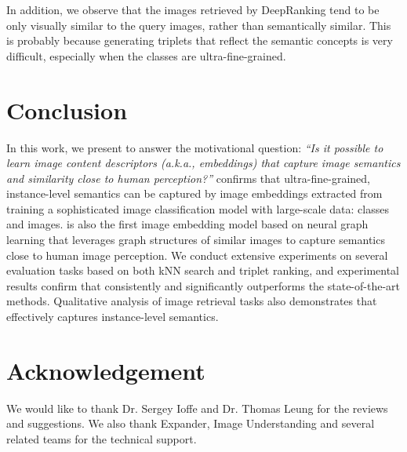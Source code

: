 \documentclass[sigconf]{acmart}
\begin{document}
In addition, we observe that the images retrieved by DeepRanking tend to be only visually similar to the query images, rather than semantically similar. This is probably because generating triplets that reflect the semantic concepts is very difficult, especially when the classes are ultra-fine-grained. 
 
\section{Conclusion}
\label{sec:conclusion}


In this work, we present {\ourmodel} to answer the motivational question: \textit{``Is it possible to learn image content descriptors (a.k.a., embeddings) that capture image semantics and similarity close to human perception?''} {\ourmodel} confirms that ultra-fine-grained, instance-level semantics can be captured by image embeddings extracted from training a sophisticated image classification model with large-scale data:  classes and  images. {\ourmodel} is also the first image embedding model based on neural graph learning that leverages graph structures of similar images to capture semantics close to human image perception. We conduct extensive experiments on several evaluation tasks based on both kNN search and triplet ranking, and experimental results confirm that {\ourmodel} consistently and significantly outperforms the state-of-the-art methods. Qualitative analysis of image retrieval tasks also demonstrates that {\ourmodel} effectively captures instance-level semantics.
 
\section*{Acknowledgement}
We would like to thank Dr. Sergey Ioffe and Dr. Thomas Leung for the reviews and suggestions. We also thank Expander, Image Understanding and several related teams for the technical support.

\balance


\end{document}
